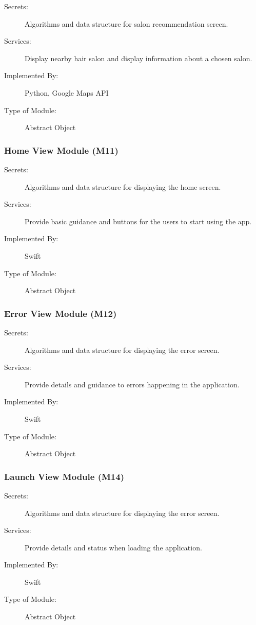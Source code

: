 \documentclass[12pt, titlepage]{article}
\begin{document}
\begin{description}
\item[Secrets:] Algorithms and data structure for salon recommendation screen.
\item[Services:] Display nearby hair salon and display information about a chosen salon.
\item[Implemented By:] Python, Google Maps API
\item[Type of Module:] Abstract Object
\end{description}

\subsubsection{Home View Module (M11)}

\begin{description}
\item[Secrets:] Algorithms and data structure for displaying the home screen.
\item[Services:] Provide basic guidance and buttons for the users to start using the app.

\item[Implemented By:] Swift
\item[Type of Module:] Abstract Object
\end{description}

\subsubsection{Error View Module (M12)}

\begin{description}
\item[Secrets:] Algorithms and data structure for displaying the error screen.
\item[Services:] Provide details and guidance to errors happening in the application.
\item[Implemented By:] Swift
\item[Type of Module:] Abstract Object
\end{description}

\subsubsection{Launch View Module (M14)}

\begin{description}
\item[Secrets:] Algorithms and data structure for displaying the error screen.
\item[Services:] Provide details and status when loading the application.
\item[Implemented By:] Swift
\item[Type of Module:] Abstract Object
\end{description}
\end{document}
